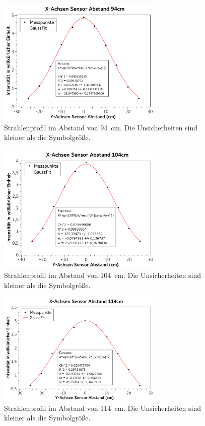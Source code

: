 \documentclass[
	a4paper,
	12pt,
	pagesize,
	ngerman
]{scrartcl}
\begin{document}
	\begin{figure}[H]
		\includegraphics[width=0.7\textwidth]{fig_94cm_gauss}
		\centering
		\caption{Strahlenprofil im Abstand von \SI{94}{cm}. Die Unsicherheiten sind kleiner als die Symbolgröße.}
		\label{fig_94cm}
		\centering
	\end{figure}
	\begin{figure}[H]
		\includegraphics[width=0.7\textwidth]{fig_104cm_gauss}
		\centering
		\caption{Strahlenprofil im Abstand von \SI{104}{cm}. Die Unsicherheiten sind kleiner als die Symbolgröße.}
		\label{fig_104cm}
		\centering
	\end{figure}
	\begin{figure}[H]
		\includegraphics[width=0.7\textwidth]{fig_114cm_gauss}
		\centering
		\caption{Strahlenprofil im Abstand von \SI{114}{cm}. Die Unsicherheiten sind kleiner als die Symbolgröße.}
		\label{fig_114cm}
		\centering
	\end{figure}
\end{document}
